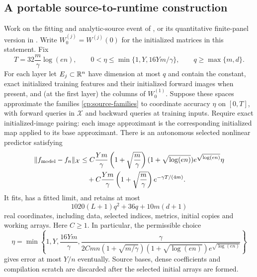 \subsection{A portable source-to-runtime construction}

\begin{proposition}
\label{cp:selected}
Work on the fitting and analytic-source event of ,
or its quantitative finite-panel version in .
Write $W_0^{(j)}=W^{(j)}(0)$ for the initialized matrices in this statement.
Fix
\[
 T=32\frac m\gamma\log(en),\qquad
 0<\eta\le\min\{1,Y,16Ym/\gamma\},\qquad
 q\ge\max\{m,d\}.
\]
For each layer let $E_j\subset\mathbb R^n$ have dimension at most $q$ and contain
the constant, exact initialized training features and their initialized
forward images when present, and (at the first layer) the columns of
$W_0^{(1)}$. Suppose these spaces approximate the families
\eqref{cp:source-families} to coordinate accuracy $\eta$ on $[0,T]$,
with forward queries in $\mathcal X$ and backward queries at training inputs.
Require exact initialized-image pairing: each image approximant is the
corresponding initialized map applied to its base approximant.
There is an autonomous selected nonlinear predictor satisfying
\begin{align}
 \|f_{\rm model}-f_n\|_{\mathcal X}
 &\le C\frac{Ym}\gamma\left(1+\sqrt{\frac m\gamma}\right)
       (1+\sqrt{\log(en)})e^{\sqrt{\log(en)}}\eta
 \nonumber\\
 &\quad+C\frac{Ym}\gamma\left(1+\sqrt{\frac m\gamma}\right)
                      e^{-\gamma T/(4m)}.
 \label{cp:smallcap-comparison}
\end{align}
It fits, has a fitted limit, and retains at most
\begin{equation}
 1020(L+1)q^2+36q+10m(d+1)
 \label{cp:selected-inventory}
\end{equation}
real coordinates, including data, selected indices, metrics, initial copies
and working arrays. Here $C\ge1$.
In particular, the permissible choice
\begin{equation}
 \eta=\min\left\{1,Y,\frac{16Ym}\gamma,
 \frac{\gamma}{2Cmn(1+\sqrt{m/\gamma})
          (1+\sqrt{\log(en)})e^{\sqrt{\log(en)}}}\right\}
 \label{cp:selected-tolerance}
\end{equation}
gives error at most $Y/n$ eventually. Source bases, dense coefficients and
compilation scratch are discarded after the selected initial arrays are formed.
\end{proposition}
